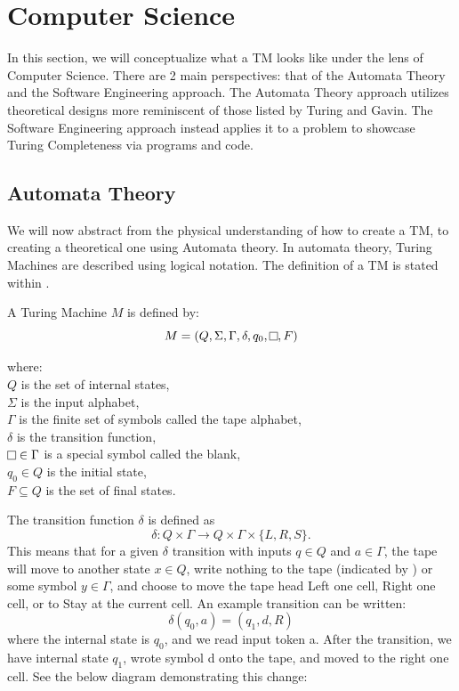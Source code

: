 \section{Computer Science}\label{sec:CompSci}

In this section, we will conceptualize what a TM looks like under the lens of Computer Science.
There are 2 main perspectives: that of the Automata Theory and the Software Engineering approach.
The Automata Theory approach utilizes theoretical designs more reminiscent of those listed by Turing and Gavin.
The Software Engineering approach instead applies it to a problem to showcase Turing Completeness via programs and code.

\subsection{Automata Theory}\label{subsec:AutomataThy}

We will now abstract from the physical understanding of how to create a TM, to creating a theoretical one using Automata theory.
In automata theory, Turing Machines are described using logical notation.
The definition of a TM is stated within \cite{IntroFormLangAuto}.

\begin{definition}
    A Turing Machine $M$ is defined by:
        \[M = (Q, \Sigma ,\Gamma, \delta, q_{0}, \raisebox{0.1cm}{\fbox{}}, F)\]
        \par \hangindent=3cm 
        where: \\
        \( Q \) is the set of internal states,\\
        \( \Sigma \) is the input alphabet,\\
        \( \Gamma \) is the finite set of symbols called the tape alphabet,\\
        \( \delta \) is the transition function,\\
        \( \raisebox{0.1cm}{\fbox{}} \in \Gamma \) is a special symbol called the blank,\\
        \( q_{0} \in Q \) is the initial state,\\
        \( F \subseteq Q \) is the set of final states.
\end{definition}

The transition function $\delta$ is defined as \[\delta: Q \times \Gamma \rightarrow Q \times \Gamma \times \{L, R, S\}.\]
This means that for a given $\delta$ transition with inputs $q \in Q$ and $a \in \Gamma$, the tape will move to another state $x \in Q$, write nothing to the tape (indicated by \raisebox{0.1cm}{\fbox{}}) or some symbol $y \in \Gamma$, and choose to move the tape head Left one cell, Right one cell, or to Stay at the current cell.
An example transition can be written: \[\delta(q_{0}, a) = (q_{1}, d, R)\] where the internal state is $q_{0}$, and we read input token a.
After the transition, we have internal state $q_{1}$, wrote symbol d onto the tape, and moved to the right one cell.
See the below diagram demonstrating this change:

